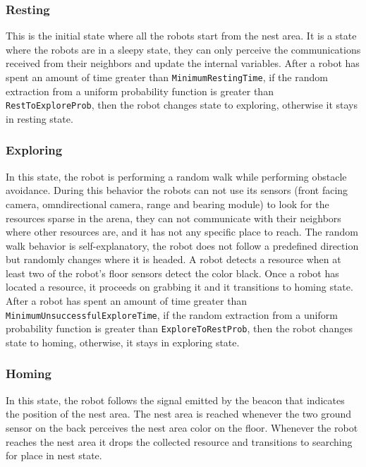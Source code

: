 \documentclass[../../Thesis.tex]{subfiles}
\begin{document}
			\subsubsection{Resting}
				This is the initial state where all the robots start from the nest area. It is a state where the robots are in a sleepy state, they can only perceive the communications received from their neighbors and update the internal variables. After a robot has spent an amount of time greater than \verb|MinimumRestingTime|, if the random extraction from a uniform probability function is greater than \verb|RestToExploreProb|, then the robot changes state to exploring, otherwise it stays in resting state.
			\subsubsection{Exploring}
				In this state, the robot is performing a random walk while performing obstacle avoidance. During this behavior the robots can not use its sensors (front facing camera, omndirectional camera, range and bearing module) to look for the resources sparse in the arena, they can not communicate with their neighbors where other resources are, and it has not any specific place to reach. The random walk behavior is self-explanatory, the robot does not follow a predefined direction but randomly changes where it is headed. A robot detects a resource when at least two of the robot's floor sensors detect the color black. Once a robot has located a resource, it proceeds on grabbing it and it transitions to homing state. After a robot has spent an amount of time greater than \verb|MinimumUnsuccessfulExploreTime|, if the random extraction from a uniform probability function is greater than \verb|ExploreToRestProb|, then the robot changes state to homing, otherwise, it stays in exploring state.
			\subsubsection{Homing}
				In this state, the robot follows the signal emitted by the beacon that indicates the position of the nest area. The nest area is reached whenever the two ground sensor on the back perceives the nest area color on the floor. Whenever the robot reaches the nest area it drops the collected resource and transitions to searching for place in nest state.
\end{document}
